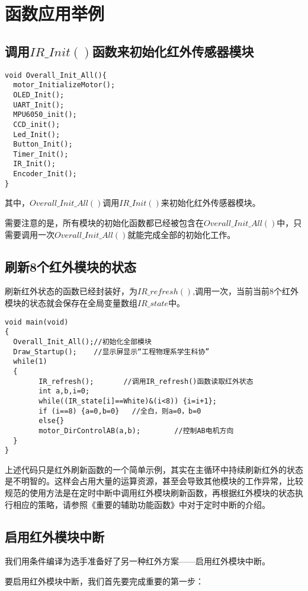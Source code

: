 \section{函数应用举例}
\subsection{调用$IR\_Init()$函数来初始化红外传感器模块}

\lstset{language=C}
\begin{lstlisting}
void Overall_Init_All(){
  motor_InitializeMotor();
  OLED_Init();
  UART_Init();
  MPU6050_init();
  CCD_init();
  Led_Init();
  Button_Init();
  Timer_Init();
  IR_Init();
  Encoder_Init();
}
\end{lstlisting}
其中，$Overall\_Init\_All()$调用$IR\_Init()$来初始化红外传感器模块。

需要注意的是，所有模块的初始化函数都已经被包含在$Overall\_Init\_All()$中，只需要调用一次$Overall\_Init\_All()$就能完成全部的初始化工作。

\subsection{刷新8个红外模块的状态}
刷新红外状态的函数已经封装好，为$IR\_refresh()$,调用一次，当前当前8个红外模块的状态就会保存在全局变量数组$IR\_state$中。
\lstset{language=C}
\begin{lstlisting}
void main(void)
{
  Overall_Init_All();//初始化全部模块
  Draw_Startup();    //显示屏显示“工程物理系学生科协”
  while(1)
  {
		IR_refresh();		//调用IR_refresh()函数读取红外状态
		int a,b,i=0;
		while((IR_state[i]==White)&(i<8)) {i=i+1};
    	if (i==8) {a=0,b=0}   //全白，则a=0，b=0
		else{}
		motor_DirControlAB(a,b);		//控制AB电机方向
  }
}

\end{lstlisting}

上述代码只是红外刷新函数的一个简单示例，其实在主循环中持续刷新红外的状态是不明智的。这样会占用大量的运算资源，甚至会导致其他模块的工作异常，比较规范的使用方法是在定时中断中调用红外模块刷新函数，再根据红外模块的状态执行相应的策略，请参照《重要的辅助功能函数》中对于定时中断的介绍。

\subsection{启用红外模块中断}
我们用条件编译为选手准备好了另一种红外方案——启用红外模块中断。

要启用红外模块中断，我们首先要完成重要的第一步：

